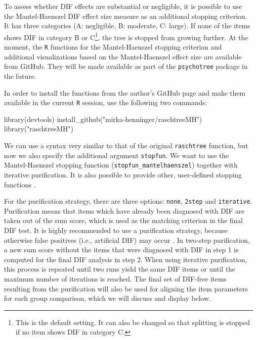 \documentclass[doc,floatsintext,natbib]{apa7}
\begin{document}
To assess whether DIF effects are substantial or negligible, it is possible to use the Mantel-Haenszel DIF effect size measure as an additional stopping criterion. It has three categories (A: negligible, B: moderate, C: large). If none of the items shows DIF in category B or C\footnote{This is the default setting. It can also be changed so that splitting is stopped if no item shows DIF in category C.}, the tree is stopped from growing further.
At the moment, the \texttt{R} functions for the Mantel-Haenszel stopping criterion and additional visualizations based on the Mantel-Haenszel effect size are available from GitHub. They will be made available as part of the \texttt{psychotree} package in the future.

In order to install the functions from the author's GitHub page and make them available in the current \texttt{R} session, use the following two commands:

\begin{Schunk}
\begin{Sinput}
 library(devtools)
 install_github("mirka-henninger/raschtreeMH")
 library("raschtreeMH")
\end{Sinput}
\end{Schunk}

We can use a syntax very similar to that of the original \texttt{raschtree} function, but now we also specify the additional argument \texttt{stopfun}. We want to use the Mantel-Haenszel stopping function (\texttt{stopfun\_mantelhaenszel}) together with iterative purification. It is also possible to provide other, user-defined stopping functions \citep[see][for details]{HennyDeba23}.

For the purification strategy, there are three options: \texttt{none}, \texttt{2step} and \texttt{iterative}. Purification means that items which have already been diagnosed with DIF are taken out of the sum score, which is used as the matching criterion in the final DIF test. It is highly recommended to use a purification strategy, because otherwise false positives (i.e., artificial DIF) may occur \citep[cf., e.g.,][and the references therein]{DebStrZei:2022:CRC,HennyDeba23,Kopfetal:2015:EPM}. In two-step purification, a new sum score without the items that were diagnosed with DIF in step 1 is computed for the final DIF analysis in step 2. When using iterative purification, this process is repeated until two runs yield the same DIF items or until the maximum number of iterations is reached. 
The final set of DIF-free items resulting from the purification will also be used for aligning the item parameters for each group comparison, which we will discuss and display below.
\end{document}
